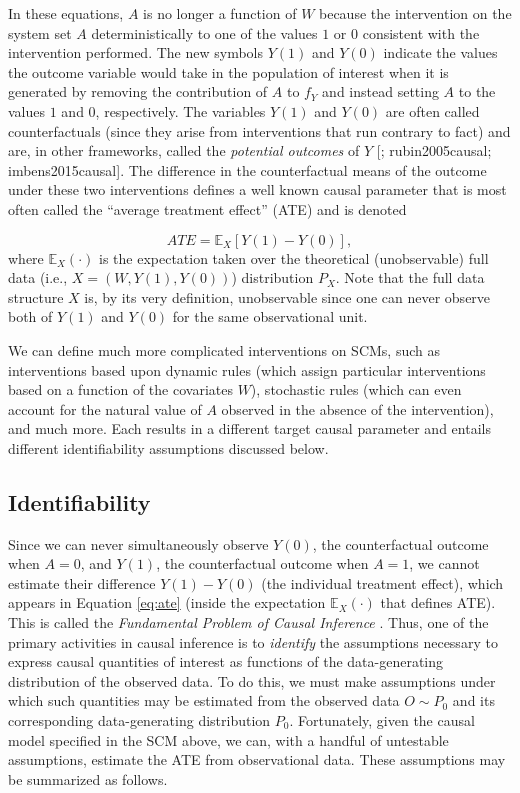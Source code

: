 \documentclass[
  12pt, krantz2,
]{krantz}
\newcommand{\E}{\mathbb{E}}
\newcommand{\1}{\mathbbm{1}}
\theoremstyle{definition}
\theoremstyle{definition}
\theoremstyle{definition}
\theoremstyle{definition}
\theoremstyle{remark}
\begin{document}
In these equations, \(A\) is no longer a function of \(W\) because the intervention
on the system set \(A\) deterministically
to one of the values \(1\) or \(0\) consistent with the intervention performed. The
new symbols \(Y(1)\) and \(Y(0)\) indicate the values the outcome variable would
take in the population of interest when it is generated by removing the
contribution of \(A\) to \(f_Y\) and instead setting \(A\) to the values \(1\) and \(0\),
respectively. The variables \(Y(1)\) and \(Y(0)\) are often called counterfactuals
(since they arise from interventions that run contrary to fact) and are, in
other frameworks, called the \emph{potential outcomes} of \(Y\)
{[}\citet{neyman1938contribution}; rubin2005causal; imbens2015causal{]}. The difference in
the counterfactual means of the outcome under these two interventions defines a
well known causal parameter that is most often called the ``average treatment
effect'' (ATE) and is denoted

\begin{equation}
  ATE = \E_X[Y(1) - Y(0)],
  \label{eq:ate}
\end{equation}
where \(\E_X(\cdot)\) is the expectation taken over the theoretical (unobservable)
full data (i.e., \(X = (W, Y(1), Y(0))\)) distribution \(P_X\). Note that the full
data structure \(X\) is, by its very definition, unobservable since one can never
observe both of \(Y(1)\) and \(Y(0)\) for the same observational unit.

We can define much more complicated interventions on SCMs, such as interventions
based upon dynamic rules (which assign particular interventions based on a
function of the covariates \(W\)), stochastic rules (which can even account for
the natural value of \(A\) observed in the absence of the intervention), and much
more. Each results in a different target causal parameter and entails different
identifiability assumptions discussed below.

\hypertarget{identifiability}{%
\subsection*{Identifiability}\label{identifiability}}


Since we can never simultaneously observe \(Y(0)\), the counterfactual outcome
when \(A=0\), and \(Y(1)\), the counterfactual outcome when \(A=1\), we cannot
estimate their difference \(Y(1) - Y(0)\) (the individual treatment effect), which
appears in Equation \eqref{eq:ate} (inside the expectation \(\E_X(\cdot)\) that
defines ATE). This is called the \emph{Fundamental Problem of Causal Inference}
\citep{holland1986statistics}. Thus, one of the primary activities in causal
inference is to \emph{identify} the assumptions necessary to express causal
quantities of interest as functions of the data-generating distribution of the
observed data. To do this, we must make assumptions under which such quantities
may be estimated from the observed data \(O \sim P_0\) and its corresponding
data-generating distribution \(P_0\). Fortunately, given the causal model
specified in the SCM above, we can, with a handful of untestable assumptions,
estimate the ATE from observational data. These assumptions may be summarized as
follows.
\end{document}
